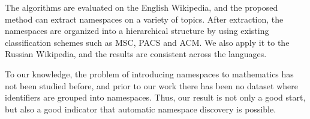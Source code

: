 The algorithms are evaluated on the English Wikipedia, and the proposed method
can extract namespaces on a variety of topics. After extraction, the namespaces 
are organized into a hierarchical structure by using existing classification schemes 
such as MSC, PACS and ACM.
We also apply it to the Russian Wikipedia, and the results are consistent across
the languages.

To our knowledge, the problem of introducing namespaces to mathematics has not
been studied before, and prior to our work there has been no dataset where identifiers
are grouped into namespaces. Thus, our result is not only a good start,
but also a good indicator that automatic namespace discovery is possible.